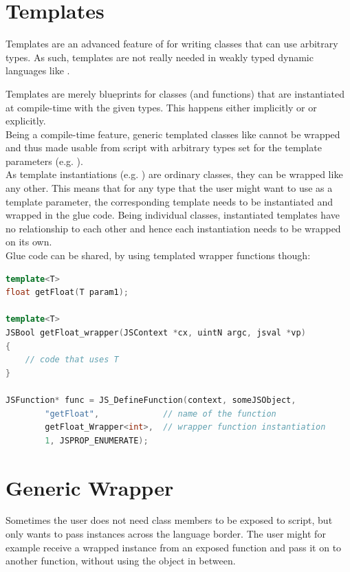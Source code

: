 \section{Templates}

Templates are an advanced feature of  for writing classes that can use arbitrary types. As such, templates are not really needed in weakly typed dynamic languages like .

Templates are merely blueprints for classes (and functions) that are instantiated at compile-time with the given types. This happens either implicitly or or explicitly.\\
Being a compile-time feature, generic templated classes like  cannot be wrapped and thus made usable from script with arbitrary types set for the template parameters (e.g. ).\\
As template instantiations (e.g. ) are ordinary classes, they can be wrapped like any other. This means that for any type that the  user might want to use as a template parameter, the corresponding template needs to be instantiated and wrapped in the glue code. Being individual classes, instantiated templates have no relationship to each other and hence each instantiation needs to be wrapped on its own.\\
Glue code can be shared, by using templated wrapper functions though: 

\SingleSpacing
\begin{lstlisting}[language=C++, caption=A templated JSNative]
template<T>
float getFloat(T param1);

template<T>
JSBool getFloat_wrapper(JSContext *cx, uintN argc, jsval *vp)
{
	// code that uses T
}

JSFunction* func = JS_DefineFunction(context, someJSObject,
        "getFloat",             // name of the function
        getFloat_Wrapper<int>,  // wrapper function instantiation
        1, JSPROP_ENUMERATE);
\end{lstlisting}
\OnehalfSpacing

\section{Generic Wrapper}
\label{sec:GenericWrapper}
Sometimes the user does not need class members to be exposed to script, but only wants to pass instances across the language border. The user might for example receive a wrapped instance from an exposed  function and pass it on to another  function, without using the  object in between.

